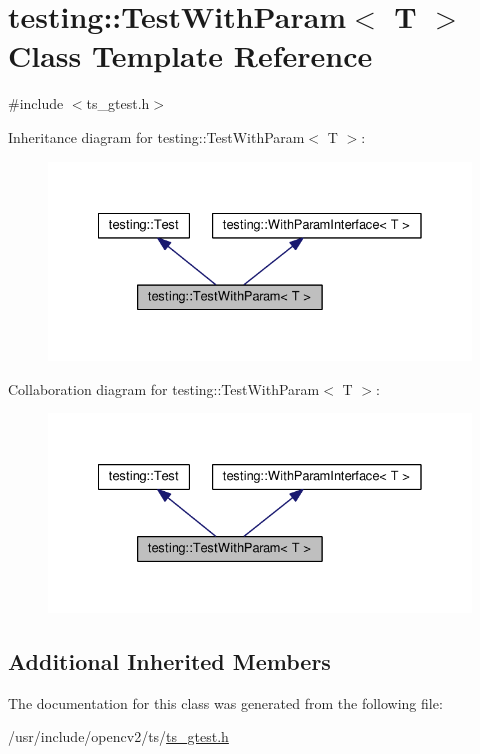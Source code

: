 \hypertarget{classtesting_1_1TestWithParam}{\section{testing\-:\-:Test\-With\-Param$<$ T $>$ Class Template Reference}
\label{classtesting_1_1TestWithParam}
}


{\ttfamily \#include $<$ts\-\_\-gtest.\-h$>$}



Inheritance diagram for testing\-:\-:Test\-With\-Param$<$ T $>$\-:\nopagebreak
\begin{figure}[H]
\begin{center}
\leavevmode
\includegraphics[width=331pt]{classtesting_1_1TestWithParam__inherit__graph}
\end{center}
\end{figure}


Collaboration diagram for testing\-:\-:Test\-With\-Param$<$ T $>$\-:\nopagebreak
\begin{figure}[H]
\begin{center}
\leavevmode
\includegraphics[width=331pt]{classtesting_1_1TestWithParam__coll__graph}
\end{center}
\end{figure}
\subsection*{Additional Inherited Members}


The documentation for this class was generated from the following file\-:\begin{DoxyCompactItemize}
\item 
/usr/include/opencv2/ts/\hyperlink{ts__gtest_8h}{ts\-\_\-gtest.\-h}\end{DoxyCompactItemize}
